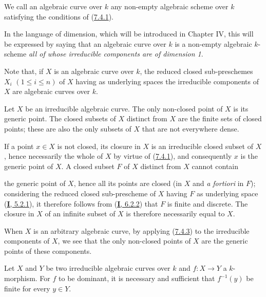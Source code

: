 \begin{definition}[7.4.2]
\label{II.7.4.2}
We call an \textup{algebraic curve} over $k$ any non-empty algebraic \textup{scheme} over $k$
satisfying the conditions of (\hyperref[II.7.4.1]{7.4.1}).
\end{definition}

In the language of dimension, which will be introduced in Chapter IV, this
will be expressed by saying that an algebraic curve over $k$ is a non-empty
algebraic $k$-scheme \emph{all of whose irreducible components are of
dimension 1}.

Note that, if $X$ is an algebraic curve over $k$, the reduced closed
sub-preschemes $X_i$ $(1\leq i\leq n)$ of $X$ having as underlying spaces
the irreducible components of $X$ are algebraic curves over $k$.

\begin{corollary}[7.4.3]
\label{II.7.4.3}
Let $X$ be an irreducible algebraic curve. The only non-closed point of $X$ is
its generic point. The closed subsets of $X$ distinct from $X$ are the
finite sets of closed points; these are also the only subsets of $X$ that
are not everywhere dense.
\end{corollary}

If a point $x\in X$ is not closed, its closure in $X$ is an irreducible
closed subset of $X$, hence necessarily the whole of $X$ by virtue of
(\hyperref[II.7.4.1]{7.4.1}), and consequently $x$ is the generic point of
$X$. A closed subset $F$ of $X$ distinct from $X$ cannot contain

the generic point of $X$, hence all its points are closed (in $X$ and
\emph{a fortiori} in $F$); considering the reduced closed sub-prescheme of
$X$ having $F$ as underlying space (\hyperref[I.5.2.1]{\textbf{I}, 5.2.1}), it
therefore follows from (\hyperref[I.6.2.2]{\textbf{I}, 6.2.2}) that $F$ is finite and
discrete. The closure in $X$ of an infinite subset of $X$ is therefore
necessarily equal to $X$.

When $X$ is an arbitrary algebraic curve, by applying
(\hyperref[II.7.4.3]{7.4.3}) to the irreducible components of $X$, we see
that the only non-closed points of $X$ are the generic points of these
components.

\begin{corollary}[7.4.4]
\label{II.7.4.4}
Let $X$ and $Y$ be two irreducible algebraic curves over $k$ and $f:X\to Y$
a $k$-morphism. For $f$ to be dominant, it is necessary and sufficient that
$f^{-1}(y)$ be finite for every $y\in Y$.
\end{corollary}

